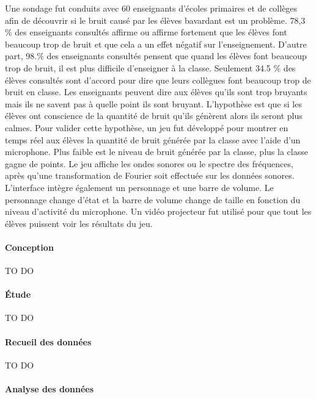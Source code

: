 \documentclass[10pt,a5paper,twoside]{article}
\begin{document}
Une sondage fut conduits avec 60 enseignants d'écoles primaires et de
collèges afin de découvrir si le bruit causé par les élèves bavardant
est un problème. 78,3 \% des enseignants consultés affirme ou affirme
fortement que les élèves font beaucoup trop de bruit et que cela a un
effet négatif sur l'enseignement. D'autre part, 98.\% des enseignants
consultés pensent que quand les élèves font beaucoup trop de bruit, il
est plus difficile d'enseigner à la classe. Seulement 34.5 \% des élèves
consultés sont d'accord pour dire que leurs collègues font beaucoup trop
de bruit en classe. Les enseignants peuvent dire aux élèves qu'ils sont
trop bruyants mais ils ne savent pas à quelle point ils sont bruyant.
L'hypothèse est que si les élèves ont conscience de la quantité de bruit
qu'ils génèrent alors ils seront plus calmes. Pour valider cette
hypothèse, un jeu fut développé pour montrer en temps réel aux élèves la
quantité de bruit générée par la classe avec l'aide d'un microphone.
Plus faible est le niveau de bruit générée par la classe, plus la classe
gagne de points. Le jeu affiche les ondes sonores ou le spectre des
fréquences, après qu'une transformation de Fourier soit effectuée sur
les données sonores. L'interface intègre également un personnage et une
barre de volume. Le personnage change d'état et la barre de volume
change de taille en fonction du niveau d'activité du microphone. Un
vidéo projecteur fut utilisé pour que tout les élèves puissent voir les
résultats du jeu.

\paragraph{Conception}\label{conception-5}

TO DO

\paragraph{Étude}\label{uxe9tude-5}

TO DO

\paragraph{Recueil des données}\label{recueil-des-donnuxe9es-4}

TO DO

\paragraph{Analyse des données}\label{analyse-des-donnuxe9es-3}
\end{document}
